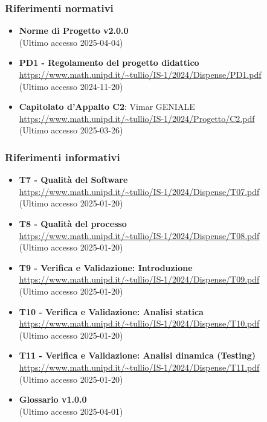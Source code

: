 \subsubsection{Riferimenti normativi}
\begin{itemize}
    \item \textbf{Norme di Progetto v2.0.0}\\
    (Ultimo accesso 2025-04-04)
    \item \textbf{PD1 - Regolamento del progetto didattico} \\
    \url{https://www.math.unipd.it/~tullio/IS-1/2024/Dispense/PD1.pdf} \\
    (Ultimo accesso 2024-11-20)
    \item \textbf{Capitolato d'Appalto C2}: Vimar GENIALE \\
    \url{https://www.math.unipd.it/~tullio/IS-1/2024/Progetto/C2.pdf}\\
    (Ultimo accesso 2025-03-26)
    \end{itemize}
\subsubsection{Riferimenti informativi}
\begin{itemize}
    \item \textbf{T7 - Qualità del Software} \\
    \url{https://www.math.unipd.it/~tullio/IS-1/2024/Dispense/T07.pdf}\\
    (Ultimo accesso 2025-01-20)
    \item \textbf{T8 - Qualità del processo} \\
    \url{https://www.math.unipd.it/~tullio/IS-1/2024/Dispense/T08.pdf}\\
    (Ultimo accesso 2025-01-20)
    \item \textbf{T9 - Verifica e Validazione: Introduzione} \\
    \url{ https://www.math.unipd.it/~tullio/IS-1/2024/Dispense/T09.pdf}\\
    (Ultimo accesso 2025-01-20)
    \item \textbf{T10 - Verifica e Validazione: Analisi statica} \\
    \url{ https://www.math.unipd.it/~tullio/IS-1/2024/Dispense/T10.pdf}\\
    (Ultimo accesso 2025-01-20)
    \item \textbf{T11 - Verifica e Validazione: Analisi dinamica (Testing)} \\
    \url{ https://www.math.unipd.it/~tullio/IS-1/2024/Dispense/T11.pdf}\\
    (Ultimo accesso 2025-01-20)
    \item \textbf{Glossario v1.0.0} \\
    (Ultimo accesso 2025-04-01)
    \end{itemize}